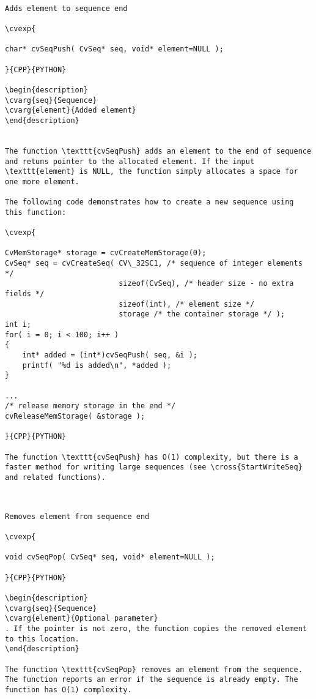 \begin{verbatim}

Adds element to sequence end

\cvexp{

char* cvSeqPush( CvSeq* seq, void* element=NULL );

}{CPP}{PYTHON}

\begin{description}
\cvarg{seq}{Sequence}
\cvarg{element}{Added element}
\end{description}


The function \texttt{cvSeqPush} adds an element to the end of sequence and retuns pointer to the allocated element. If the input \texttt{element} is NULL, the function simply allocates a space for one more element.

The following code demonstrates how to create a new sequence using this function:

\cvexp{

CvMemStorage* storage = cvCreateMemStorage(0);
CvSeq* seq = cvCreateSeq( CV\_32SC1, /* sequence of integer elements */
                          sizeof(CvSeq), /* header size - no extra fields */
                          sizeof(int), /* element size */
                          storage /* the container storage */ );
int i;
for( i = 0; i < 100; i++ )
{
    int* added = (int*)cvSeqPush( seq, &i );
    printf( "%d is added\n", *added );
}

...
/* release memory storage in the end */
cvReleaseMemStorage( &storage );

}{CPP}{PYTHON}

The function \texttt{cvSeqPush} has O(1) complexity, but there is a faster method for writing large sequences (see \cross{StartWriteSeq} and related functions).


\end{verbatim}
\begin{verbatim}

Removes element from sequence end

\cvexp{

void cvSeqPop( CvSeq* seq, void* element=NULL );

}{CPP}{PYTHON}

\begin{description}
\cvarg{seq}{Sequence}
\cvarg{element}{Optional parameter}
. If the pointer is not zero, the function copies the removed element to this location.
\end{description}

The function \texttt{cvSeqPop} removes an element from the sequence. The function reports an error if the sequence is already empty. The function has O(1) complexity.


\end{verbatim}
